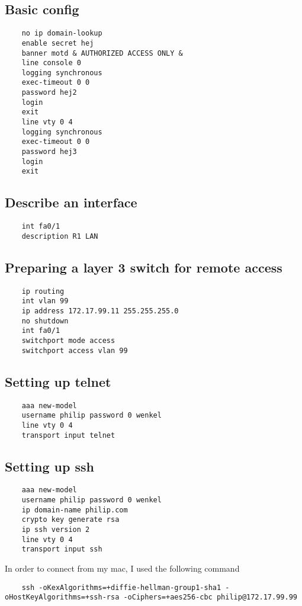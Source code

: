 \documentclass{article}
\begin{document}
\subsection{Basic config}
\begin{verbatim}
	no ip domain-lookup
	enable secret hej
	banner motd & AUTHORIZED ACCESS ONLY &
	line console 0
	logging synchronous
	exec-timeout 0 0
	password hej2
	login
	exit
	line vty 0 4
	logging synchronous
	exec-timeout 0 0
	password hej3
	login
	exit
\end{verbatim}

\subsection{Describe an interface}
\begin{verbatim}
	int fa0/1
	description R1 LAN
\end{verbatim}

\subsection{Preparing a layer 3 switch for remote access}

\begin{verbatim}
	ip routing
	int vlan 99
	ip address 172.17.99.11 255.255.255.0
	no shutdown
	int fa0/1
	switchport mode access
	switchport access vlan 99
\end{verbatim}

\subsection{Setting up telnet}
\begin{verbatim}
	aaa new-model
	username philip password 0 wenkel
	line vty 0 4
	transport input telnet
\end{verbatim}

\subsection{Setting up ssh}
\begin{verbatim}
	aaa new-model
	username philip password 0 wenkel
	ip domain-name philip.com
	crypto key generate rsa
	ip ssh version 2
	line vty 0 4
	transport input ssh
\end{verbatim}

In order to connect from my mac, I used the following command 

\begin{verbatim}
	ssh -oKexAlgorithms=+diffie-hellman-group1-sha1 -oHostKeyAlgorithms=+ssh-rsa -oCiphers=+aes256-cbc philip@172.17.99.99
\end{verbatim}
\end{document}
